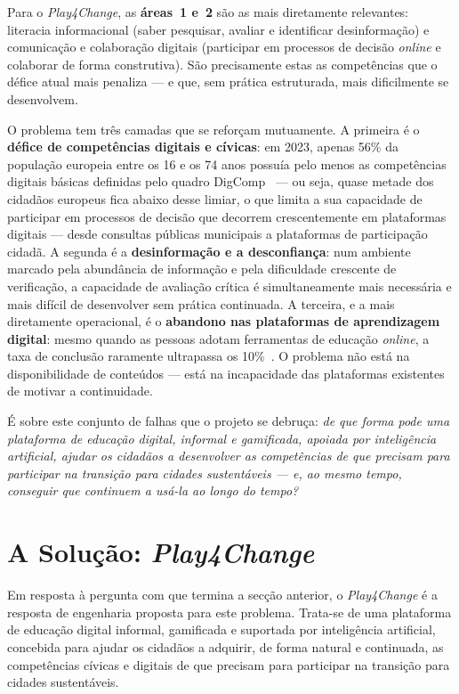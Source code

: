 Para o \emph{Play4Change}, as \textbf{áreas~1 e~2} são as mais diretamente relevantes: literacia informacional (saber pesquisar, avaliar e identificar desinformação) e comunicação e colaboração digitais (participar em processos de decisão \emph{online} e colaborar de forma construtiva). São precisamente estas as competências que o défice atual mais penaliza --- e que, sem prática estruturada, mais dificilmente se desenvolvem.

O problema tem três camadas que se reforçam mutuamente. A primeira é o \textbf{défice de competências digitais e cívicas}: em 2023, apenas 56\% da população europeia entre os 16 e os 74 anos possuía pelo menos as competências digitais básicas definidas pelo quadro DigComp~\cite{vuorikari2022digcomp,eurostat2023digitalskills} --- ou seja, quase metade dos cidadãos europeus fica abaixo desse limiar, o que limita a sua capacidade de participar em processos de decisão que decorrem crescentemente em plataformas digitais --- desde consultas públicas municipais a plataformas de participação cidadã. A segunda é a \textbf{desinformação e a desconfiança}: num ambiente marcado pela abundância de informação e pela dificuldade crescente de verificação, a capacidade de avaliação crítica é simultaneamente mais necessária e mais difícil de desenvolver sem prática continuada. A terceira, e a mais diretamente operacional, é o \textbf{abandono nas plataformas de aprendizagem digital}: mesmo quando as pessoas adotam ferramentas de educação \emph{online}, a taxa de conclusão raramente ultrapassa os 10\%~\cite{jordan2014mooc}. O problema não está na disponibilidade de conteúdos --- está na incapacidade das plataformas existentes de motivar a continuidade.

É sobre este conjunto de falhas que o projeto se debruça: \emph{de que forma pode uma plataforma de educação digital, informal e gamificada, apoiada por inteligência artificial, ajudar os cidadãos a desenvolver as competências de que precisam para participar na transição para cidades sustentáveis --- e, ao mesmo tempo, conseguir que continuem a usá-la ao longo do tempo?}

\section{A Solução: \emph{Play4Change}}
\label{sec:solucao}

Em resposta à pergunta com que termina a secção anterior, o \emph{Play4Change} é a resposta de engenharia proposta para este problema. Trata-se de uma plataforma de educação digital informal, gamificada e suportada por inteligência artificial, concebida para ajudar os cidadãos a adquirir, de forma natural e continuada, as competências cívicas e digitais de que precisam para participar na transição para cidades sustentáveis.

